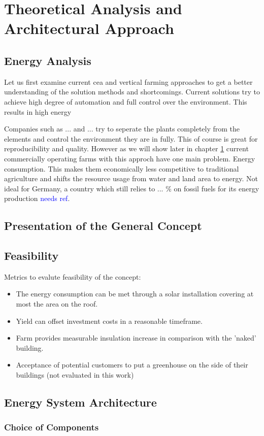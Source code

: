 \chapter{Theoretical Analysis and Architectural Approach}
\label{chap:analysis-and-arch}
%
\section{Energy Analysis}
\label{sec:energy-analysis}
Let us first examine current \ac{cea} and vertical farming approaches to get a better understanding of the solution methods and shortcomings.
Current solutions try to achieve high degree of automation and full control over the environment.
This results in high energy

Companies such as ... and ... try to seperate the plants completely from the elements and control the environment they are in fully.
This of course is great for reproducibility and quality.
However as we will show later in chapter \ref{chap:analysis-and-arch} current commercially operating farms with this approch have one main problem.
Energy consumption.
This makes them economically less competitive to traditional agriculture and shifts the resource usage from water and land area to energy.
Not ideal for Germany, a country which still relies to ... \% on fossil fuels for its energy production \textcolor{blue}{needs ref}.



\section{Presentation of the General Concept}
\label{sec:concept}
\section{Feasibility}
\label{sec:feasibility}
Metrics to evalute feasibility of the concept:
\begin{itemize}
	\item The energy consumption can be met through a solar installation covering at most the area on the roof.
	\item Yield can offset investment costs in a reasonable timeframe.
	\item Farm provides measurable insulation increase in comparison with the 'naked' building.
	\item Acceptance of potential customers to put a greenhouse on the side of their buildings (not evaluated in this work)
\end{itemize}

\section{Energy System Architecture}
\label{sec:architecture}

\subsection{Choice of Components}
